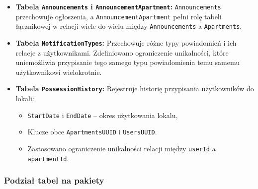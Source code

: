 \begin{itemize}
    \item \textbf{Tabela \texttt{Announcements} i \texttt{AnnouncementApartment}:}
    \texttt{Announcements} przechowuje ogłoszenia, a \texttt{AnnouncementApartment} pełni rolę tabeli łącznikowej w relacji wiele do wielu między \texttt{Announcements} a \texttt{Apartments}.

    \item \textbf{Tabela \texttt{NotificationTypes}:}
    Przechowuje różne typy powiadomień i ich relacje z użytkownikami. Zdefiniowano ograniczenie unikalności, które uniemożliwia przypisanie tego samego typu powiadomienia temu samemu użytkownikowi wielokrotnie.

    \item \textbf{Tabela \texttt{PossessionHistory}:}
    Rejestruje historię przypisania użytkowników do lokali:
    \begin{itemize}
        \item \texttt{StartDate} i \texttt{EndDate} -- okres użytkowania lokalu,
        \item Klucze obce \texttt{ApartmentsUUID} i \texttt{UsersUUID}.
        \item Zastosowano ograniczenie unikalności relacji między \texttt{userId} a \texttt{apartmentId}.
    \end{itemize}
\end{itemize}

\subsubsection{Podział tabel na pakiety}

